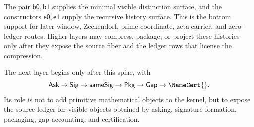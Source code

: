 \begin{principle}
\label{prin:kernel-spine-self-similar-starting-surface}
The pair $\mathsf{b0},\mathsf{b1}$ supplies the minimal visible distinction
surface, and the constructors $\mathsf{e0},\mathsf{e1}$ supply the recursive
history surface.  This is the bottom support for later window, Zeckendorf,
prime-coordinate, zeta-carrier, and zero-ledger routes.  Higher layers may
compress, package, or project these histories only after they expose the
source fiber and the ledger rows that license the compression.
\end{principle}


\begin{principle}
\label{prin:kernel-spine-next-layer-boundary}
The next layer begins only after this spine, with
$$
\mathsf{Ask}
\to
\mathsf{Sig}
\to
\mathsf{sameSig}
\to
\mathsf{Pkg}
\to
\mathsf{Gap}
\to
\NameCert{}.
$$
Its role is not to add primitive mathematical objects to the kernel, but
to expose the source ledger for visible objects obtained by asking,
signature formation, packaging, gap accounting, and certification.
\end{principle}
